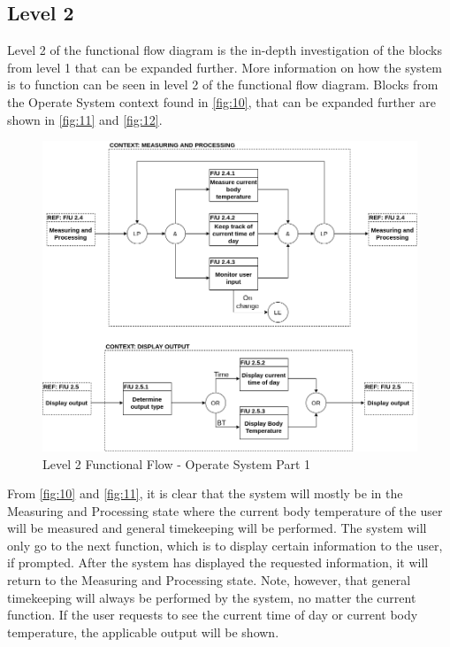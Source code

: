\subsection{Level 2}
Level 2 of the functional flow diagram is the in-depth investigation of the blocks from level 1 that can be expanded further. More information on how the system is to function can be seen in level 2 of the functional flow diagram. Blocks from the Operate System context found in \autoref{fig:10}, that can be expanded further are shown in \autoref{fig:11} and \autoref{fig:12}.
\begin{figure}[H]
	\centering
	\includegraphics[scale=0.5]{img/L2FF1}
	\caption{Level 2 Functional Flow - Operate System Part 1}
	\label{fig:11}
\end{figure}
\noindent
From \autoref{fig:10} and \autoref{fig:11}, it is clear that the system will mostly be in the Measuring and Processing state where the current body temperature of the user will be measured and general timekeeping will be performed. The system will only go to the next function, which is to display certain information to the user, if prompted. After the system has displayed the requested information, it will return to the Measuring and Processing state. Note, however, that general timekeeping will always be performed by the system, no matter the current function. If the user requests to see the current time of day or current body temperature, the applicable output will be shown.
